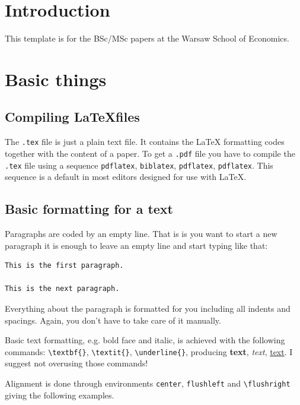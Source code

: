 \documentclass[english, twoside, 12pt, a4paper]{article}
\theoremstyle{definition}
\theoremstyle{plain}
\theoremstyle{remark}
\begin{document}
\cleardoublepage
\section{Introduction}

This template is for the BSc/MSc papers at the Warsaw School of Economics. 

\clearpage
\section{Basic things}

\subsection{Compiling \LaTeX files}

The \verb+.tex+ file is just a plain text file. It contains the \LaTeX{} formatting codes together with the content of a paper. To get a \verb+.pdf+ file you have to compile the \verb+.tex+ file using a sequence \verb+pdflatex+, \verb+biblatex+, \verb+pdflatex+, \verb+pdflatex+. This sequence is a default in most editors designed for use with \LaTeX.

\subsection{Basic formatting for a text}

Paragraphs are coded by an empty line. That is is you want to start a new paragraph it is enough to leave an empty line and start typing like that:
\begin{verbatim}
This is the first paragraph.

This is the next paragraph.
\end{verbatim}

Everything about the paragraph is formatted for you including all indents and spacings. Again, you don't have to take care of it manually.

Basic text formatting, e.g. bold face and italic, is achieved with the following commands: \verb+\textbf{}+, \verb+\textit{}+, \verb+\underline{}+, producing \textbf{text}, \textit{text}, \underline{text}. I suggest not overusing those commands!

Alignment is done through environments \verb+center+, \verb+flushleft+ and \verb+\flushright+ giving the following examples.
\end{document}
